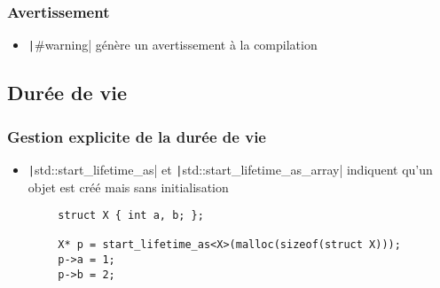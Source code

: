 \documentclass[C++.tex]{subfiles}
\begin{document}
\begin{frame}[fragile]
	\frametitle{Avertissement}
	\begin{itemize}
		\item \texttt|#warning| génère un avertissement à la compilation
	\end{itemize}


\end{frame}

\subsection*{Durée de vie}
\begin{frame}[fragile]
	\frametitle{Gestion explicite de la durée de vie}
	\begin{itemize}
		\item \texttt|std::start_lifetime_as| et \texttt|std::start_lifetime_as_array| indiquent qu'un objet est créé mais sans initialisation
	\end{itemize}

	\begin{verbatim}
		struct X { int a, b; };

		X* p = start_lifetime_as<X>(malloc(sizeof(struct X)));
		p->a = 1;
		p->b = 2;
	\end{verbatim}

\end{frame}
\end{document}
